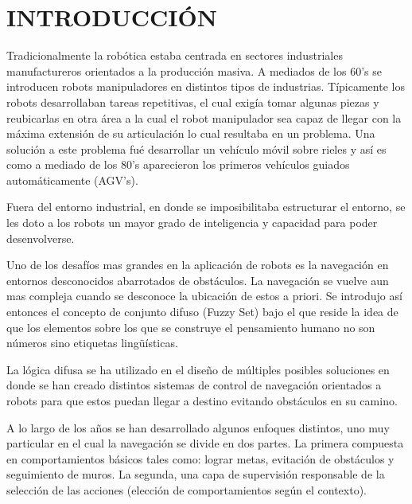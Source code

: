 \section{INTRODUCCIÓN}

Tradicionalmente la robótica estaba centrada en sectores industriales manufactureros orientados a la producción masiva. A mediados de los 60's se introducen robots manipuladores en distintos tipos de industrias. Típicamente los robots desarrollaban tareas repetitivas, el cual exigía tomar algunas piezas y reubicarlas en otra área a la cual el robot manipulador sea capaz de llegar con la máxima extensión de su articulación lo cual resultaba en un problema. Una solución a este problema fué desarrollar un vehículo móvil sobre rieles y así es como a mediado de los 80's aparecieron los primeros vehículos guiados automáticamente (AGV's).\par
Fuera del entorno industrial, en donde se imposibilitaba estructurar el entorno, se les doto a los robots un mayor grado de inteligencia y capacidad para poder desenvolverse.\par

Uno de los desafíos mas grandes en la aplicación de robots es la navegación en entornos desconocidos abarrotados de obstáculos. La navegación se vuelve aun mas compleja cuando se desconoce la ubicación de estos a priori. Se introdujo así entonces el concepto de conjunto difuso (Fuzzy Set) bajo el que reside la idea de que los elementos sobre los que se construye el pensamiento humano no son números sino etiquetas lingüísticas. \par

La lógica difusa se ha utilizado en el diseño de múltiples posibles soluciones en donde se han creado distintos sistemas de control de navegación orientados a robots para que estos puedan llegar a destino evitando obstáculos en su camino.\par 
A lo largo de los años se han desarrollado algunos enfoques distintos, uno muy particular en el cual la navegación se divide en dos partes. La primera compuesta en comportamientos básicos tales como: lograr metas, evitación de obstáculos y seguimiento de muros. La segunda, una capa de supervisión responsable de la selección de las acciones (elección de comportamientos según el contexto). \par

